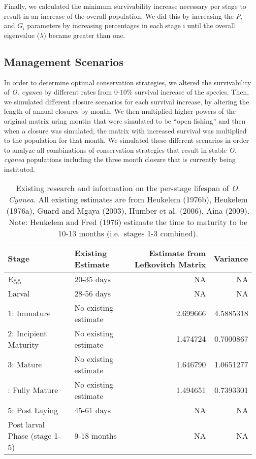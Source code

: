 \documentclass[
]{article}
\begin{document}
Finally, we calculated the minimum survivability increase necessary per stage to result in an increase of the overall population. We did this by increasing the \(P_i\) and \(G_i\) parameters by increasing percentages in each stage i until the overall eigenvalue (\(\lambda\)) became greater than one.

\hypertarget{management-scenarios}{%
\subsection{Management Scenarios}\label{management-scenarios}}

In order to determine optimal conservation strategies, we altered the survivability of \emph{O. cyanea} by different rates from 0-10\% survival increase of the species. Then, we simulated different closure scenarios for each survival increase, by altering the length of annual closures by month. We then multiplied higher powers of the original matrix uring months that were simulated to be ``open fishing'' and then when a closure was simulated, the matrix with increased survival was multiplied to the population for that month. We simulated these different scenarios in order to analyze all combinations of conservation strategies that result in stable \emph{O. cyanea} populations including the three month closure that is currently being instituted.

\begin{table}

\caption{\label{tab:LifeHistory}Existing research and information on the per-stage lifespan of \emph{O. Cyanea}. All existing estimates are from Heukelem (1976b), Heukelem (1976a), Guard and Mgaya (2003), Humber et al. (2006), Aina (2009). Note: Heukelem and Fred (1976) estimate the time to maturity to be 10-13 months (i.e.~stages 1-3 combined). \label{LifeHistory}}
\centering
\begin{tabular}[t]{llrr}
\toprule
Stage & Existing Estimate & Estimate from Lefkovitch Matrix & Variance\\
\midrule
Egg & 20-35 days & NA & NA\\
Larval & 28-56 days & NA & NA\\
1: Immature & No existing estimate & 2.699666 & 4.5885318\\
2: Incipient Maturity & No existing estimate & 1.474724 & 0.7000867\\
3: Mature & No existing estimate & 1.646790 & 1.0651277\\
\addlinespace
4: Fully Mature & No existing estimate & 1.494651 & 0.7393301\\
5: Post Laying & 45-61 days & NA & NA\\
Post larval Phase (stage 1-5) & 9-18 months & NA & NA\\
\bottomrule
\end{tabular}
\end{table}
\end{document}
